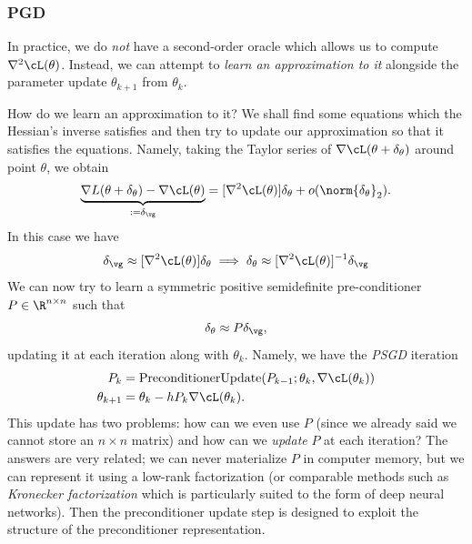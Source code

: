\documentclass[../../book-main.tex]{subfiles}
\begin{document}
\subsubsection{PGD}

In practice, we do \textit{not} have a second-order oracle which allows us to compute \(\nabla^{2}\cL(\theta)\). Instead, we can attempt to \textit{learn an approximation to it} alongside the parameter update \(\theta_{k + 1}\) from \(\theta_{k}\). 

How do we learn an approximation to it? We shall find some equations which the Hessian's inverse satisfies and then try to update our approximation so that it satisfies the equations. Namely, taking the Taylor series of \(\nabla \cL(\theta + \delta_{\theta})\) around point \(\theta\), we obtain 
\begin{equation}
    \underbrace{\nabla L(\theta + \delta_{\theta}) - \nabla \cL(\theta)}_{:= \delta_{\vg}} = [\nabla^{2} \cL(\theta)]\delta_{\theta} + o(\norm{\delta_{\theta}}_{2}).
\end{equation}
In this case we have 
\begin{equation}
    \delta_{\vg} \approx [\nabla^{2}\cL(\theta)]\delta_{\theta} \implies \delta_{\theta} \approx [\nabla^{2}\cL(\theta)]^{-1}\delta_{\vg}
\end{equation}
We can now try to learn a symmetric positive semidefinite pre-conditioner \(P \in \R^{n \times n}\) such that 
\begin{equation}
    \delta_{\theta} \approx P\delta_{\vg},
\end{equation}
updating it at each iteration along with \(\theta_{k}\). Namely, we have the \textit{PSGD} iteration
\begin{align}
    P_{k}
    &= \mathrm{PreconditionerUpdate}(P_{k - 1}; \theta_{k}, \nabla \cL(\theta_{k})) \\ 
    \theta_{k + 1}
    &= \theta_{k} - hP_{k}\nabla \cL(\theta_{k}).
\end{align}
This update has two problems: how can we even use \(P\) (since we already said we cannot store an \(n \times n\) matrix) and how can we \textit{update} \(P\) at each iteration? The answers are very related; we can never materialize \(P\) in computer memory, but we can represent it using a low-rank factorization (or comparable methods such as \textit{Kronecker factorization} which is particularly suited to the form of deep neural networks). Then the preconditioner update step is designed to exploit the structure of the preconditioner representation.
\end{document}
